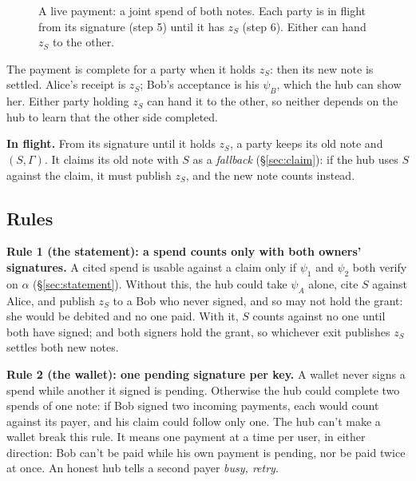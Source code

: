 \documentclass[11pt]{article}
\theoremstyle{plain}
\theoremstyle{definition}
\newcommand{\Compl}{\mathsf{Complete}}
\begin{document}
\begin{figure}[!tbp]
\caption{A live payment: a joint spend of both notes. Each party is in
flight from its signature (step 5) until it has $z_S$ (step 6). Either
can hand $z_S$ to the other.}
\label{fig:payment}
\end{figure}

The payment is complete for a party when it holds $z_S$: then its new
note is settled. Alice's receipt is $z_S$; Bob's acceptance is his
$\psi_B$, which the hub can show her. Either party holding $z_S$ can
hand it to the other, so neither depends on the hub to learn that the
other side completed.

\textbf{In flight.} From its signature until it holds $z_S$, a party
keeps its old note and $(S, \Gamma)$. It claims its old note with $S$
as a \emph{fallback} (\S\ref{sec:claim}): if the hub uses $S$ against the
claim, it must publish $z_S$, and the new note counts instead.

\subsection{Rules}\label{sec:rules}

\textbf{Rule 1 (the statement): a spend counts only with both owners'
signatures.} A cited spend is usable against a claim only if $\psi_1$
and $\psi_2$ both verify on $\alpha$ (\S\ref{sec:statement}). Without
this, the hub could take $\psi_A$ alone, cite $S$ against Alice, and
publish $z_S$ to a Bob who never signed, and so may not hold the grant:
she would be debited and no one paid. With it, $S$ counts against no one
until both have signed; and both signers hold the grant, so whichever
exit publishes $z_S$ settles both new notes.

\textbf{Rule 2 (the wallet): one pending signature per key.} A wallet
never signs a spend while another it signed is pending. Otherwise the
hub could complete two spends of one note: if Bob signed two incoming
payments, each would count against its payer, and his claim could
follow only one. The hub can't make a wallet break this rule. It means
one payment at a time per user, in either direction: Bob can't be paid
while his own payment is pending, nor be paid twice at once. An honest
hub tells a second payer \emph{busy, retry}.
\end{document}
